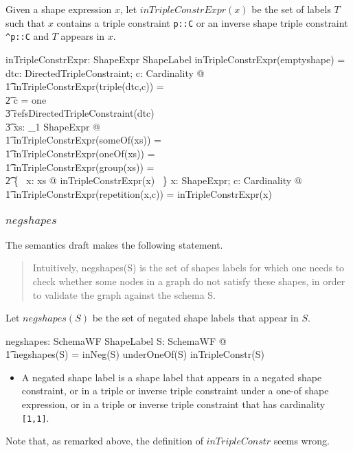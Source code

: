 \documentclass{article}
\begin{document}
Given a shape expression $x$, let $inTripleConstrExpr(x)$ be the set of labels $T$ such that $x$ contains a triple constraint 
{\tt p::C} or an inverse shape triple constraint {\tt \verb+^+p::C} and $T$ appears in $x$.
\begin{axdef}
	inTripleConstrExpr: ShapeExpr \fun \finset ShapeLabel
\where
	inTripleConstrExpr(emptyshape) = \emptyset
\also
	\forall dtc: DirectedTripleConstraint; c: Cardinality @ \\
\t1		inTripleConstrExpr(triple(dtc,c)) = \\
\t2			\IF c = one \\
\t3				\THEN refsDirectedTripleConstraint(dtc) \\
\t3				\ELSE \emptyset
\also
	\forall xs: \seq_1 ShapeExpr @ \\
\t1		inTripleConstrExpr(someOf(xs)) = \\
\t1		inTripleConstrExpr(oneOf(xs)) = \\
\t1		inTripleConstrExpr(group(xs)) = \\
\t2			\bigcup \{~ x: \ran xs @ inTripleConstrExpr(x) ~\}
\also
	\forall x: ShapeExpr; c: Cardinality @ \\
\t1		inTripleConstrExpr(repetition(x,c)) = inTripleConstrExpr(x)
\end{axdef}

\subsubsection{$negshapes$}
The semantics draft makes the following statement.
\begin{quote}
Intuitively, negshapes(S) is the set of shapes labels for which one needs to check whether some nodes in a graph do not satisfy these shapes, in order to validate the graph against the schema S.
\end{quote}

Let $negshapes(S)$ be the set of negated shape labels that appear in $S$.
\begin{axdef}
	negshapes: SchemaWF \fun \finset ShapeLabel
\where
	\forall S: SchemaWF @ \\
\t1		negshapes(S) = inNeg(S) \cup underOneOf(S) \cup inTripleConstr(S)
\end{axdef}
\begin{itemize}
\item A negated shape label is a shape label that appears in a negated shape constraint, or in a triple or inverse triple constraint under a one-of shape expression, or in a triple or inverse triple constraint that has cardinality {\tt [1,1]}.
\end{itemize}
Note that, as remarked above, the definition of $inTripleConstr$ seems wrong.
\end{document}
